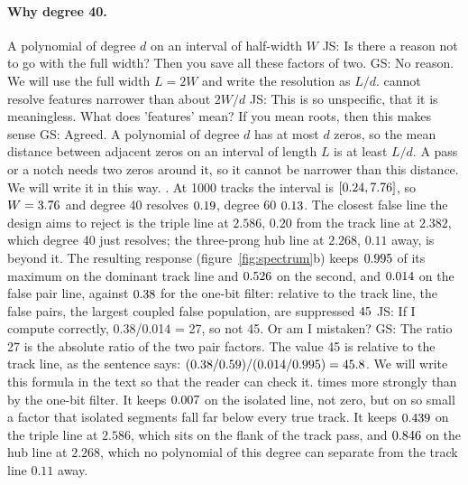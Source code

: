 \documentclass[11pt,a4paper]{article}
\newcommand{\js}[1]{{\color{blue} JS: #1 }}
\newcommand{\gs}[1]{{\color{orange!85!black} GS: #1 }}
\begin{document}
\paragraph{Why degree 40.}
A polynomial of degree $d$ on an interval of half-width $W$ \js{Is there a reason not to go with the full width? Then you save all these factors of two.} \gs{No reason. We will use the full width $L=2W$ and write the resolution as $L/d$.} cannot resolve features narrower than
about $2W/d$ \js{This is so unspecific, that it is meaningless. What does 'features' mean? If you mean roots, then this makes sense} \gs{Agreed. A polynomial of degree $d$ has at most $d$ zeros, so the mean distance between adjacent zeros on an interval of length $L$ is at least $L/d$. A pass or a notch needs two zeros around it, so it cannot be narrower than this distance. We will write it in this way.}. At 1000 tracks the interval is $[0.24,7.76]$, so $W=3.76$ and
degree 40 resolves $0.19$, degree 60 $0.13$. The closest false line the design aims to reject is the triple line at $2.586$, $0.20$ from the
track line at $2.382$, which degree 40 just resolves; the three-prong hub line at $2.268$, $0.11$ away,
is beyond it. The resulting response (figure~\ref{fig:spectrum}b) keeps
$0.995$ of its maximum on the dominant track line and $0.526$ on the second, and
$0.014$ on the false pair line, against $0.38$ for the one-bit filter: relative to the
track line, the false pairs, the largest coupled false population, are suppressed
$45$ \js{If I compute correctly, 0.38/0.014 = 27, so not 45. Or am I mistaken?} \gs{The ratio 27 is the absolute ratio of the two pair factors. The value 45 is relative to the track line, as the sentence says: $(0.38/0.59)/(0.014/0.995)=45.8$. We will write this formula in the text so that the reader can check it.} times more strongly than by the one-bit filter. It keeps $0.007$ on the isolated line, not zero, but on so small a factor that isolated
segments fall far below every true track. It keeps $0.439$ on the triple line at $2.586$,
which sits on the flank of the track pass, and $0.846$ on the hub line at $2.268$, which no
polynomial of this degree can separate from the track line $0.11$ away.
\end{document}
